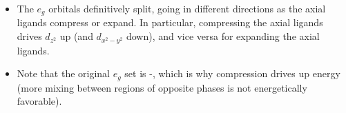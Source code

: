\documentclass[../notes.tex]{subfiles}
\begin{document}
\begin{itemize}
\begin{itemize}
        \item The $e_g$ orbitals definitively split, going in different directions as the axial ligands compress or expand. In particular, compressing the axial ligands drives $d_{z^2}$ up (and $d_{x^2-y^2}$ down), and vice versa for expanding the axial ligands.
        \item Note that the original $e_g$ set is -, which is why compression drives up energy (more mixing between regions of opposite phases is not energetically favorable).
    \end{itemize}
\end{itemize}
\end{document}
